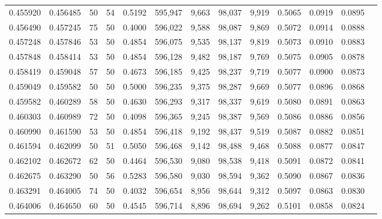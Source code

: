 \begin{tabular}{rrrrrrrrrrrrr}
0.455920 & 0.456485 &    50 &  54 &                                     0.5192 & 595,947 &   9,663 &  98,037 &   9,919 & 0.5065 & 0.0919 & 0.0895 \\
0.456490 & 0.457245 &    75 &  50 &                                     0.4000 & 596,022 &   9,588 &  98,087 &   9,869 & 0.5072 & 0.0914 & 0.0888 \\
0.457248 & 0.457846 &    53 &  50 &                                     0.4854 & 596,075 &   9,535 &  98,137 &   9,819 & 0.5073 & 0.0910 & 0.0883 \\
0.457848 & 0.458414 &    53 &  50 &                                     0.4854 & 596,128 &   9,482 &  98,187 &   9,769 & 0.5075 & 0.0905 & 0.0878 \\
0.458419 & 0.459048 &    57 &  50 &                                     0.4673 & 596,185 &   9,425 &  98,237 &   9,719 & 0.5077 & 0.0900 & 0.0873 \\
0.459049 & 0.459582 &    50 &  50 &                                     0.5000 & 596,235 &   9,375 &  98,287 &   9,669 & 0.5077 & 0.0896 & 0.0868 \\
0.459582 & 0.460289 &    58 &  50 &                                     0.4630 & 596,293 &   9,317 &  98,337 &   9,619 & 0.5080 & 0.0891 & 0.0863 \\
0.460303 & 0.460989 &    72 &  50 &                                     0.4098 & 596,365 &   9,245 &  98,387 &   9,569 & 0.5086 & 0.0886 & 0.0856 \\
0.460990 & 0.461590 &    53 &  50 &                                     0.4854 & 596,418 &   9,192 &  98,437 &   9,519 & 0.5087 & 0.0882 & 0.0851 \\
0.461594 & 0.462099 &    50 &  51 &                                     0.5050 & 596,468 &   9,142 &  98,488 &   9,468 & 0.5088 & 0.0877 & 0.0847 \\
0.462102 & 0.462672 &    62 &  50 &                                     0.4464 & 596,530 &   9,080 &  98,538 &   9,418 & 0.5091 & 0.0872 & 0.0841 \\
0.462675 & 0.463290 &    50 &  56 &                                     0.5283 & 596,580 &   9,030 &  98,594 &   9,362 & 0.5090 & 0.0867 & 0.0836 \\
0.463291 & 0.464005 &    74 &  50 &                                     0.4032 & 596,654 &   8,956 &  98,644 &   9,312 & 0.5097 & 0.0863 & 0.0830 \\
0.464006 & 0.464650 &    60 &  50 &                                     0.4545 & 596,714 &   8,896 &  98,694 &   9,262 & 0.5101 & 0.0858 & 0.0824 \\

\end{tabular}
